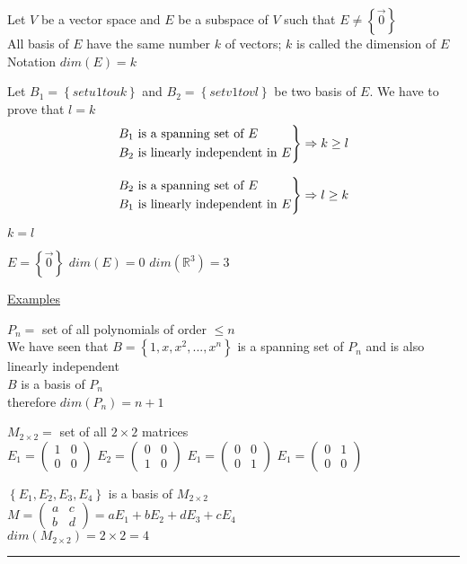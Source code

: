 \documentclass[12pt]{article}
\renewcommand{\v}[1]{\overrightarrow{#1}}
\newcommand\mm[1]{\begin{pmatrix}#1\end{pmatrix}}
\newcommand{\real}[0]{\mathbb{R}}
\newenvironment{proof}{\block[Proof]}{\endblock}
\newenvironment{theorem}{\block[Theorem]}{\endblock}
\newenvironment{remark}{\block[Remark]}{\endblock}
\newenvironment{examples}{\shownto{-,compact}\underline{Examples}\enumerate}{\endenumerate\divider\endshownto}
\newcommand{\bb}[1]{\left\{#1\right\}}
\newcommand{\divider}[0]{\par\textcolor{lightgray}{\rule{\textwidth}{0.1pt}}}
\begin{document}
\begin{theorem}
	Let $V$ be a vector space and $E$ be a subspace of $V$ such that $E \ne \bb{\v{0}}$ \\
	All basis of $E$ have the same number $k$ of vectors; $k$ is called the dimension of $E$ \\
	Notation \qquad $dim(E) = k$
	
	\begin{proof}
		Let $B_1 = \bb{set u1 to uk}$ and $B_2 = \bb{set v1 to vl}$ be two basis of $E$. We have to prove that $l = k$ \\
		
		\begin{equation*}
			\begin{rcases*}
				B_1 \text{ is a spanning set of } E \\
				B_2 \text{ is linearly independent in } E
			\end{rcases*} \Rightarrow k \ge l
		\end{equation*}
		
		\begin{equation*}
		\begin{rcases*}
		B_2 \text{ is a spanning set of } E \\
		B_1 \text{ is linearly independent in } E
		\end{rcases*} \Rightarrow l \ge k
		\end{equation*}
		
		$k = l$
	\end{proof}
\end{theorem}

\begin{remark}
	$E = \bb{\v{0}}$ \quad
	$dim(E) = 0$ \quad
	$dim(\real^3) = 3$
\end{remark}

\begin{examples}
	\item $P_n =$ set of all polynomials of order $\le n$ \\
	We have seen that $B = \bb{1, x, x^2, ..., x^n}$ is a spanning set of $P_n$ and is also linearly independent \\
	
	$B$ is a basis of $P_n$ \\
	therefore $dim(P_n) = n + 1$
	
	\item $M_{2 \times 2} =$ set of all $2 \times 2$ matrices \\
	$E_1 = \mm{1 & 0 \\ 0 & 0}$
	$E_2 = \mm{0 & 0 \\ 1 & 0}$
	$E_1 = \mm{0 & 0 \\ 0 & 1}$
	$E_1 = \mm{0 & 1 \\ 0 & 0}$
	
	$\bb{E_1, E_2, E_3, E_4}$ is a basis of $M_{2 \times 2}$ \\
	$M = \mm{a & c \\ b & d} = aE_1 + bE_2 + dE_3 + cE_4$ \\
	$dim(M_{2 \times 2}) = 2 \times 2 = 4$
\end{examples}
\end{document}
